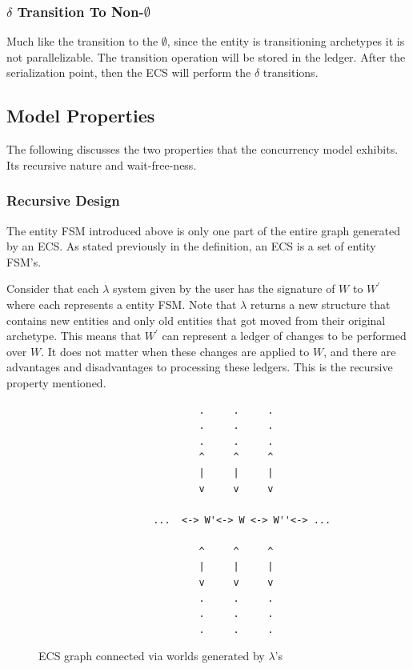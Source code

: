 \subsubsection{$\delta$ Transition To Non-$\emptyset$}
Much like the transition to the $\emptyset$, since the entity is transitioning archetypes it is not parallelizable. The transition operation will be stored in the ledger. After the serialization point, then the ECS will perform the $\delta$ transitions. 

\subsection{Model Properties}
The following discusses the two properties that the concurrency model exhibits. Its recursive nature and wait-free-ness. 

\subsubsection{Recursive Design}
\label{sec:recursive_design}
The entity FSM introduced above is only one part of the entire graph generated by an ECS. As stated previously in the definition, an ECS is a set of entity FSM's. 

Consider that each $\lambda$ system given by the user has the signature of $W$ to $W^\prime$ where each represents a entity FSM. Note that $\lambda$ returns a new structure that contains new entities and only old entities that got moved from their original archetype. This means that $W^\prime$ can represent a ledger of changes to be performed over $W$. It does not matter when these changes are applied to $W$, and there are advantages and disadvantages to processing these ledgers. This is the recursive property mentioned.

\begin{figure}[htbp]
    \centering
    \begin{verbatim}
                            .     .     .         
                            .     .     .         
                            .     .     .         
                            ^     ^     ^         
                            |     |     |         
                            v     v     v         
                                                
                    ...  <-> W'<-> W <-> W''<-> ...
                                                
                            ^     ^     ^         
                            |     |     |         
                            v     v     v         
                            .     .     .         
                            .     .     .         
                            .     .     .         
    \end{verbatim}
    \caption{ECS graph connected via worlds generated by $\lambda$'s}
\end{figure}

